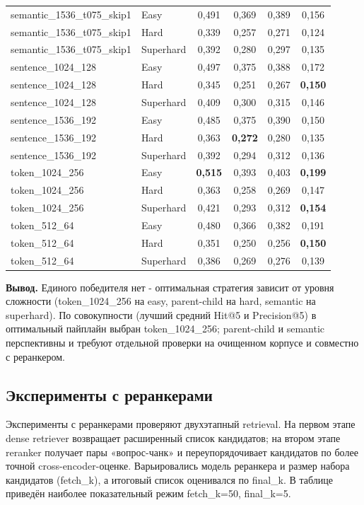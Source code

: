 \documentclass[a4paper,12pt]{article}
\begin{document}
\begin{table}[H]
{\begin{tabular}{|l|l|c|c|c|c|}
semantic\_1536\_t075\_skip1 & Easy & 0,491 & 0,369 & 0,389 & 0,156 \\
semantic\_1536\_t075\_skip1 & Hard & 0,339 & 0,257 & 0,271 & 0,124 \\
semantic\_1536\_t075\_skip1 & Superhard & 0,392 & 0,280 & 0,297 & 0,135 \\
sentence\_1024\_128 & Easy & 0,497 & 0,375 & 0,388 & 0,172 \\
sentence\_1024\_128 & Hard & 0,345 & 0,251 & 0,267 & \textbf{0,150} \\
sentence\_1024\_128 & Superhard & 0,409 & 0,300 & 0,315 & 0,146 \\
sentence\_1536\_192 & Easy & 0,485 & 0,375 & 0,390 & 0,150 \\
sentence\_1536\_192 & Hard & 0,363 & \textbf{0,272} & 0,280 & 0,135 \\
sentence\_1536\_192 & Superhard & 0,392 & 0,294 & 0,312 & 0,136 \\
token\_1024\_256 & Easy & \textbf{0,515} & 0,393 & 0,403 & \textbf{0,199} \\
token\_1024\_256 & Hard & 0,363 & 0,258 & 0,269 & 0,147 \\
token\_1024\_256 & Superhard & 0,421 & 0,293 & 0,312 & \textbf{0,154} \\
token\_512\_64 & Easy & 0,480 & 0,366 & 0,382 & 0,191 \\
token\_512\_64 & Hard & 0,351 & 0,250 & 0,256 & \textbf{0,150} \\
token\_512\_64 & Superhard & 0,386 & 0,269 & 0,276 & 0,139 \\
\hline
\end{tabular}%
}
\end{table}
\FloatBarrier

\textbf{Вывод.} Единого победителя нет - оптимальная стратегия зависит от уровня сложности (token\_1024\_256 на easy, parent-child на hard, semantic на superhard). По совокупности (лучший средний Hit@5 и Precision@5) в оптимальный пайплайн выбран token\_1024\_256; parent-child и semantic перспективны и требуют отдельной проверки на очищенном корпусе и совместно с реранкером.

\subsection{Эксперименты с реранкерами}

Эксперименты с реранкерами проверяют двухэтапный retrieval. На первом этапе dense retriever возвращает расширенный список кандидатов; на втором этапе reranker получает пары «вопрос-чанк» и переупорядочивает кандидатов по более точной cross-encoder-оценке. Варьировались модель реранкера и размер набора кандидатов (fetch\_k), а итоговый список оценивался по final\_k. В таблице приведён наиболее показательный режим fetch\_k=50, final\_k=5.
\end{document}
